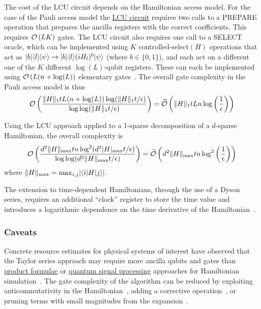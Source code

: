 \begin{refsection}
The cost of the LCU circuit depends on the Hamiltonian access model. For the case of the Pauli access model the \hyperref[prim:LCU]{LCU circuit} requires two calls to a PREPARE operation that prepares the ancilla registers with the correct coefficients. This requires $\mathcal{O}\left( LK \right)$ gates. The LCU circuit also requires one call to a SELECT oracle, which can be implemented using $K$ controlled-select$(H)$ operations that act as $\lvert b\rangle\lvert l\rangle\lvert\psi\rangle \rightarrow \lvert b\rangle\lvert l\rangle (iH_l)^b \lvert\psi\rangle$ (where $b \in \{0,1\}$), and each act on a different one of the $K$ different $\log(L)$-qubit registers. These can each be implemented using $\mathcal{O}\left( L(n + \log(L) \right)$ elementary gates~\cite{berry2014HamSimTaylor}. The overall gate complexity in the Pauli access model is thus
\begin{align}
 \mathcal{O}\left(  \frac{\lVert H\rVert_1 t L(n + \log(L))\log(\lVert H\rVert_1 t / \epsilon) }{\log\log(\lVert H\rVert_1 t / \epsilon)}   \right) =   \widetilde{\mathcal{O}}\left(  \lVert H\rVert_1 t Ln \log\left( \frac{1}{\epsilon} \right)   \right)
\end{align}

Using the LCU approach applied to a 1-sparse decomposition of a $d$-sparse Hamiltonian, the overall complexity is~\cite{berry2014HamSimTaylor}
\begin{align}
 \mathcal{O}\left(  \frac{d^2 \lVert H\rVert_{\mathrm{max}} t n \log^2(d^2 |H|_{\mathrm{max}} t / \epsilon) }{\log\log(d^2 \lVert H\rVert_{\mathrm{max}} t / \epsilon)}   \right) = 
 \widetilde{\mathcal{O}}\left(  d^2 \lVert H\rVert_{\mathrm{max}} t n \log^2\left( \frac{1}{\epsilon} \right)  \right) 
\end{align}
where $\lVert H\rVert_{\mathrm{max}} = \mathrm{max}_{i,j} \lvert \langle i\rvert H\lvert j\rangle \rvert$. 

The extension to time-dependent Hamiltonians, through the use of a Dyson series, requires an additional ``clock'' register to store the time value and introduces a logarithmic dependence on the time derivative of the Hamiltonian~\cite{kieferova2019DysonSeriesSimulation,berry2019TimeDependentHamSimL1}.




\subsubsection*{Caveats}
Concrete resource estimates for physical systems of interest have observed that the Taylor series approach may require more ancilla qubits and gates than \hyperref[prim:ProductFormulae]{product formulae} or \hyperref[prim:QSPqubitization]{quantum signal processing} approaches for Hamiltonian simulation~\cite{childs2018towardsFirstQSimSpeedup}. The gate complexity of the algorithm can be reduced by exploiting anticommutativity in the Hamiltonian~\cite{Zhao2021ExploitingAnticommutationTaylorSeries}, adding a corrective operation~\cite{novo2016improved}, or pruning terms with small magnitudes from the expansion~\cite{Meister2022tailoringterm}. 



\end{refsection}
